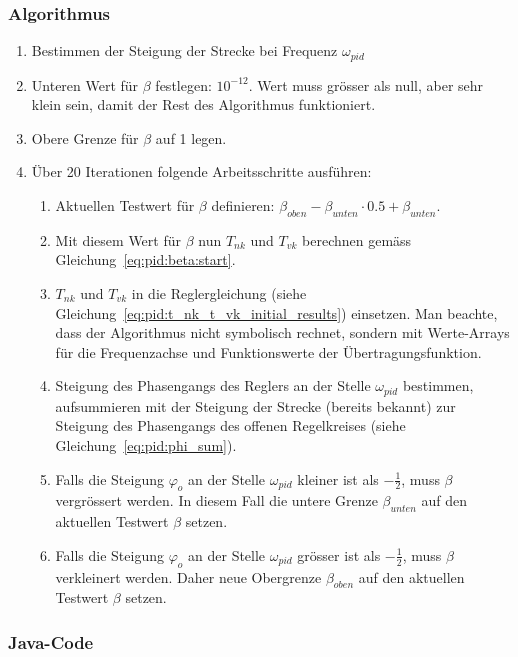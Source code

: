 \subsubsection*{Algorithmus}
\begin{enumerate}
        \item
            Bestimmen der Steigung der Strecke bei Frequenz $\omega_{pid}$
        \item
            Unteren  Wert   f\"ur  $\beta$   festlegen: $10^{-12}$. Wert  muss
            gr\"osser  als null,  aber sehr  klein  sein, damit  der Rest  des
            Algorithmus funktioniert.
        \item
            Obere Grenze f\"ur $\beta$ auf 1 legen.
        \item
            \"Uber 20 Iterationen folgende Arbeitsschritte ausf\"uhren:
            \begin{enumerate}
                \item
                    Aktuellen Testwert f\"ur $\beta$ definieren: $\beta_{oben}
                    - \beta_{unten} \cdot 0.5 + \beta_{unten}$.
                \item
                    Mit diesem  Wert f\"ur  $\beta$ nun $T_{nk}$  und $T_{vk}$
                    berechnen gem\"ass Gleichung~\ref{eq:pid:beta:start}.
                \item
                    $T_{nk}$  und  $T_{vk}$   in  die  Reglergleichung  (siehe
                    Gleichung~\ref{eq:pid:t_nk_t_vk_initial_results}) einsetzen.
                    Man  beachte,   dass  der  Algorithmus   nicht  symbolisch
                    rechnet, sondern mit  Werte-Arrays f\"ur die Frequenzachse
                    und Funktionswerte der \"Ubertragungsfunktion.
                \item
                    Steigung    des   Phasengangs    des   Reglers    an   der
                    Stelle  $\omega_{pid}$  bestimmen,  aufsummieren  mit  der
                    Steigung  der  Strecke   (bereits  bekannt)  zur  Steigung
                    des   Phasengangs   des    offenen   Regelkreises   (siehe
                    Gleichung~\ref{eq:pid:phi_sum}).
                \item
                    Falls   die    Steigung   $\varphi_o$   an    der   Stelle
                    $\omega_{pid}$  kleiner   ist  als   $-\frac{1}{2}$,  muss
                    $\beta$ vergr\"ossert  werden.  In diesem Fall  die untere
                    Grenze $\beta_{unten}$ auf  den aktuellen Testwert $\beta$
                    setzen.
                \item
                    Falls   die    Steigung   $\varphi_o$   an    der   Stelle
                    $\omega_{pid}$  gr\"osser  ist  als  $-\frac{1}{2}$,  muss
                    $\beta$   verkleinert    werden. Daher   neue   Obergrenze
                    $\beta_{oben}$ auf den aktuellen Testwert $\beta$ setzen.
            \end{enumerate}
\end{enumerate}

\subsubsection*{Java-Code}

